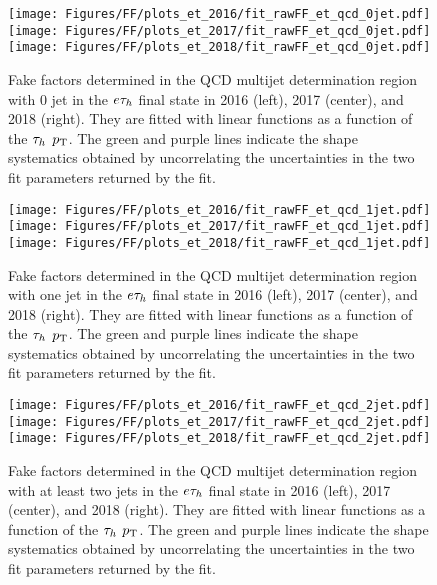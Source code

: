 \begin{figure}[ht!b]
\centering
\texttt{[image: Figures/FF/plots\_et\_2016/fit\_rawFF\_et\_qcd\_0jet.pdf]}
\texttt{[image: Figures/FF/plots\_et\_2017/fit\_rawFF\_et\_qcd\_0jet.pdf]}
\texttt{[image: Figures/FF/plots\_et\_2018/fit\_rawFF\_et\_qcd\_0jet.pdf]}\\
\caption{\label{fig:fit_raw_et_0jet_qcd} Fake factors determined in the QCD multijet determination region with 0 jet in the $e\tau_h$ final state in 2016 (left), 2017 (center), and 2018 (right). They are fitted with linear functions as a function of the $\tau_h$ $p_{\mathrm{T}}$. The green and purple lines indicate the shape systematics obtained by uncorrelating the uncertainties in the two fit parameters returned by the fit.  }
\end{figure}


\begin{figure}[ht!b]
\centering
\texttt{[image: Figures/FF/plots\_et\_2016/fit\_rawFF\_et\_qcd\_1jet.pdf]}
\texttt{[image: Figures/FF/plots\_et\_2017/fit\_rawFF\_et\_qcd\_1jet.pdf]}
\texttt{[image: Figures/FF/plots\_et\_2018/fit\_rawFF\_et\_qcd\_1jet.pdf]}\\
\caption{\label{fig:fit_raw_et_1jet_qcd} Fake factors determined in the QCD multijet determination region with one jet in the $e\tau_h$ final state in 2016 (left), 2017 (center), and 2018 (right). They are fitted with linear functions as a function of the $\tau_h$ $p_{\mathrm{T}}$. The green and purple lines indicate the shape systematics obtained by uncorrelating the uncertainties in the two fit parameters returned by the fit.  }
\end{figure}

\begin{figure}[ht!b]
\centering
\texttt{[image: Figures/FF/plots\_et\_2016/fit\_rawFF\_et\_qcd\_2jet.pdf]}
\texttt{[image: Figures/FF/plots\_et\_2017/fit\_rawFF\_et\_qcd\_2jet.pdf]}
\texttt{[image: Figures/FF/plots\_et\_2018/fit\_rawFF\_et\_qcd\_2jet.pdf]}\\
\caption{\label{fig:fit_raw_et_2jet_qcd} Fake factors determined in the QCD multijet determination region with at least two jets in the $e\tau_h$ final state in 2016 (left), 2017 (center), and 2018 (right). They are fitted with linear functions as a function of the $\tau_h$ $p_{\mathrm{T}}$. The green and purple lines indicate the shape systematics obtained by uncorrelating the uncertainties in the two fit parameters returned by the fit.  }
\end{figure}



